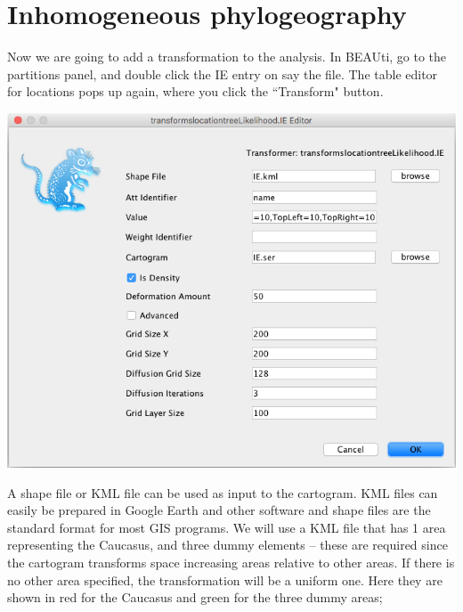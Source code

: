 \documentclass{article}
\begin{document}
\section*{Inhomogeneous phylogeography}

Now we are going to add a transformation to the analysis. In BEAUti, go to the partitions panel, and double click the IE entry on say the file. The table editor for locations pops up again, where you click the ``Transform" button.

\begin{center}
\includegraphics[scale=0.4]{figures/BEAUti_transform8}
\end{center}

A shape file or KML file can be used as input to the cartogram. KML files can easily be prepared in Google Earth and other software and shape files are the standard format for most GIS programs. We will use a KML file that has 1 area representing the Caucasus, and three dummy elements -- these are required since the cartogram transforms space increasing areas relative to other areas. If there is no other area specified, the transformation will be a uniform one. Here they are shown in red for the Caucasus and green for the three dummy areas;
\end{document}
